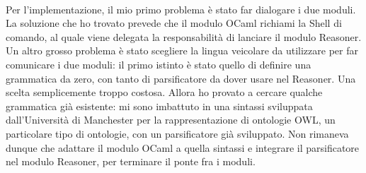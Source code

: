 \paragraph{} Per l'implementazione, il mio primo problema è stato far dialogare i due moduli. La soluzione che ho trovato prevede che il modulo OCaml richiami la Shell di comando, al quale viene delegata la responsabilità di lanciare il modulo Reasoner. \\
Un altro grosso problema è stato scegliere la lingua veicolare da utilizzare per far comunicare i due moduli: il primo istinto è stato quello di definire una grammatica da zero, con tanto di parsificatore da dover usare nel Reasoner. Una scelta semplicemente troppo costosa. Allora ho provato a cercare qualche grammatica già esistente: mi sono imbattuto in una sintassi sviluppata dall'Università di Manchester per la rappresentazione di ontologie OWL, un particolare tipo di ontologie, con un parsificatore già sviluppato. Non rimaneva dunque che adattare il modulo OCaml a quella sintassi e integrare il parsificatore nel modulo Reasoner, per terminare il ponte fra i moduli.